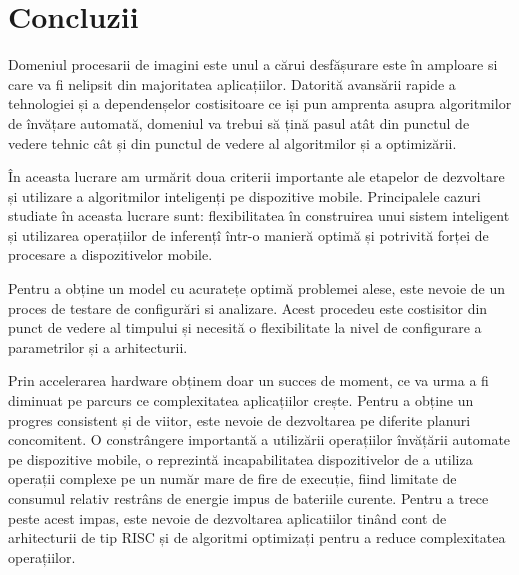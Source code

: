 \chapter{Concluzii}

Domeniul procesarii de imagini este unul a cărui desfășurare este în amploare si care va fi nelipsit din majoritatea aplicațiilor. Datorită avansării rapide a tehnologiei și a dependenșelor costisitoare ce iși pun amprenta asupra algoritmilor de învățare automată, domeniul va trebui să țină pasul atât din punctul de vedere tehnic cât și din punctul de vedere al algoritmilor și a optimizării. \newline

În aceasta lucrare am urmărit doua criterii importante ale etapelor de dezvoltare și utilizare a algoritmilor inteligenți pe dispozitive mobile. Principalele cazuri studiate în aceasta lucrare sunt: flexibilitatea în construirea unui sistem inteligent și utilizarea operațiilor de inferențî într-o manieră optimă și potrivită forței de procesare a dispozitivelor mobile.\newline

Pentru a obține un model cu acuratețe optimă problemei alese, este nevoie de un proces de testare de configurări si analizare. Acest procedeu este costisitor din punct de vedere al timpului și necesită o flexibilitate la nivel de configurare a parametrilor și a arhitecturii.\newline

Prin accelerarea hardware obținem doar un succes de moment, ce va urma a fi diminuat pe parcurs ce complexitatea aplicațiilor crește. Pentru a obține un progres consistent și de viitor, este nevoie de dezvoltarea pe diferite planuri concomitent. O constrângere importantă a utilizării operațiilor învățării automate pe dispozitive mobile, o reprezintă incapabilitatea dispozitivelor de a utiliza operații complexe pe un număr mare de fire de execuție, fiind limitate de consumul relativ restrâns de energie impus de bateriile curente. Pentru a trece peste acest impas, este nevoie de dezvoltarea aplicatiilor tinând cont de arhitecturii de tip RISC și de algoritmi optimizați pentru a reduce complexitatea operațiilor.

